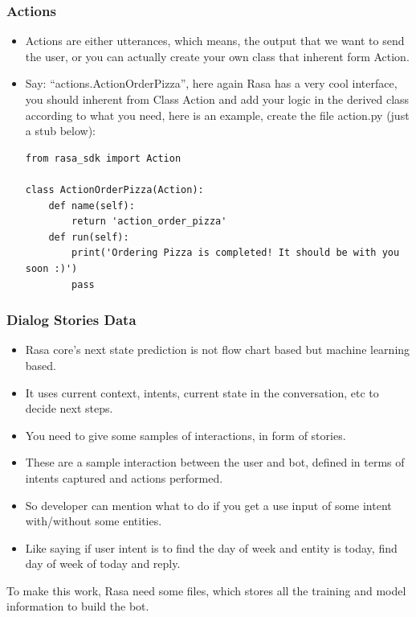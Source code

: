  \begin{frame}[fragile]\frametitle{Actions}
\begin{itemize}
\item Actions are either utterances, which means, the output that we want to send the user, or you can actually create your own class that inherent form Action. 
\item Say: ``actions.ActionOrderPizza'', here again Rasa has a very cool interface, you should inherent from Class Action and add your logic in the derived class according to what you need, here is an example, create the file action.py (just a stub below):
\begin{lstlisting}
from rasa_sdk import Action

class ActionOrderPizza(Action):
    def name(self):
        return 'action_order_pizza'
    def run(self):
        print('Ordering Pizza is completed! It should be with you soon :)')
        pass
\end{lstlisting}
\end{itemize}

\end{frame}


 \begin{frame}[fragile]\frametitle{Dialog Stories Data}
\begin{itemize}
\item Rasa core's next state prediction is not flow chart based but machine learning based. 
\item It uses current context, intents, current state in the conversation, etc to decide next steps.
\item You need to give some samples of interactions, in form of stories.
\item These are a sample interaction between the user and bot, defined in terms of intents captured and actions performed. 
\item So developer can mention what to do if you get a use input of some intent with/without some entities. 
\item Like saying if user intent is to find the day of week and entity is today, find day of week of today and reply.
\end{itemize}

To make this work, Rasa need some files, which stores all the training and model information to build the bot.
\end{frame}

